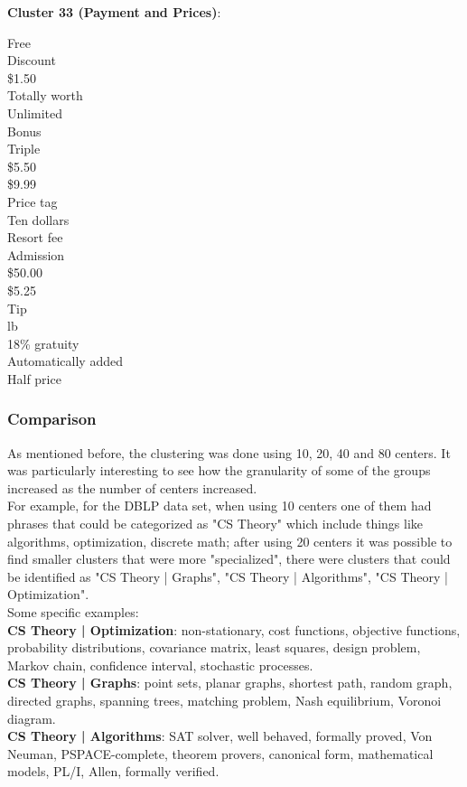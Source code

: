 \documentclass[11pt]{article}
\begin{document}
\textbf{Cluster 33 (Payment and Prices)}:
\begin{multicols}{3}
Free\\
Discount\\
\$1.50\\
Totally worth\\
Unlimited\\
Bonus\\
Triple\\
\$5.50\\
\$9.99\\
Price tag\\
Ten dollars\\
Resort fee\\
Admission\\
\$50.00\\
\$5.25\\
Tip\\
lb\\
18\% gratuity\\
Automatically added\\
Half price
\end{multicols}

\subsubsection*{Comparison}
As mentioned before, the clustering was done using 10, 20, 40 and 80 centers. It was particularly interesting to see how the granularity of some of the groups increased as the number of centers increased.\\

For example, for the DBLP data set, when using 10 centers one of them had phrases that could be categorized as "CS Theory" which include things like algorithms, optimization, discrete math; after using 20 centers it was possible to find smaller clusters that were more "specialized", there were clusters that could be identified as "CS Theory | Graphs", "CS Theory | Algorithms", "CS Theory | Optimization". \\

Some specific examples: \\
\textbf{CS Theory | Optimization}: non-stationary, cost functions, objective functions, probability distributions, covariance matrix, least squares, design problem, Markov chain, confidence interval, stochastic processes.\\
\textbf{CS Theory | Graphs}: point sets, planar graphs, shortest path, random graph, directed graphs, spanning trees, matching problem, Nash equilibrium, Voronoi diagram.\\
\textbf{CS Theory | Algorithms}: SAT solver, well behaved, formally proved, Von Neuman, PSPACE-complete, theorem provers, canonical form, mathematical models, PL/I, Allen, formally verified.\\
\end{document}
